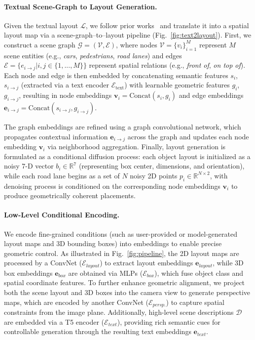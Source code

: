 \paragraph{Textual Scene-Graph to Layout Generation.}
Given the textual layout $\mathcal{L}$, we follow prior works~\cite{commonscenes, echoscene} and translate it into a spatial layout map via a scene-graph–to–layout pipeline (Fig.~\ref{fig:text2layout}).
First, we construct a scene graph $\mathcal{G}=(\mathcal{V}, \mathcal{E})$, where nodes $\mathcal{V} = \{v_i\}_{i=1}^M$ represent $M$ scene entities (e.g., \textit{cars}, \textit{pedestrians}, \textit{road lanes}) and edges $\mathcal{E} = \{e_{i \rightarrow j}|i,j \in\{1,...,M\}\}$ represent spatial relations (e.g., \textit{front of}, \textit{on top of}). 
Each node and edge is then embedded by concatenating semantic features $s_i$, $s_{i \rightarrow j}$ (extracted via a text encoder $\mathcal{E}_{\text{text}}$) with learnable geometric features $g_i$, $g_{i \rightarrow j}$, resulting in node embeddings $\mathbf{v}_i = \text{Concat}(s_i, g_i)$ and edge embeddings $\mathbf{e}_{i \rightarrow j} = \text{Concat}(s_{i \rightarrow j}, g_{i \rightarrow j})$.

The graph embeddings are refined using a graph convolutional network, which propagates contextual information $\mathbf{e}_{i \rightarrow j}$ across the graph and updates each node embedding $\mathbf{v}_i$ via neighborhood aggregation.
Finally, layout generation is formulated as a conditional diffusion process: each object layout is initialized as a noisy 7-D vector $b_i \in \mathbb{R}^7$ (representing box center, dimensions, and orientation), while each road lane begins as a set of $N$ noisy 2D points $p_i \in \mathbb{R}^{N \times 2}$, with denoising process is conditioned on the corresponding node embeddings $\mathbf{v}_i$ to produce geometrically coherent placements.

\paragraph{Low-Level Conditional Encoding.}
We encode fine-grained conditions (such as user-provided or model-generated layout maps and 3D bounding boxes) into embeddings to enable precise geometric control. As illustrated in Fig.~\ref{fig:pipeline}, the 2D layout maps are processed by a ConvNet ($\mathcal{E}_\textit{layout}$) to extract layout embeddings $\mathbf{e}_\textit{layout}$, while 3D box embeddings $\mathbf{e}_\textit{box}$ are obtained via MLPs ($\mathcal{E}_{\textit{box}}$), which fuse object class and spatial coordinate features.
To further enhance geometric alignment, we project both the scene layout and 3D boxes into the camera view to generate perspective maps, which are encoded by another ConvNet ($\mathcal{E}_\textit{persp.}$) to capture spatial constraints from the image plane.
Additionally, high-level scene descriptions $\mathcal{D}$ are embedded via a T5 encoder ($\mathcal{E}_{\textit{text}}$), providing rich semantic cues for controllable generation through the resulting text embeddings $\mathbf{e}_\textit{text}$.


